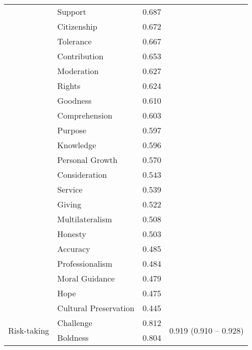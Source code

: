 \begin{longtable}{llcc}
                                  & Support                 & 0.687 & \\
                                  & Citizenship             & 0.672 & \\
                                  & Tolerance               & 0.667 & \\
                                  & Contribution            & 0.653 & \\
                                  & Moderation              & 0.627 & \\
                                  & Rights                  & 0.624 & \\
                                  & Goodness                & 0.610 & \\
                                  & Comprehension           & 0.603 & \\
                                  & Purpose                 & 0.597 & \\
                                  & Knowledge               & 0.596 & \\
                                  & Personal Growth         & 0.570 & \\
                                  & Consideration           & 0.543 & \\
                                  & Service                 & 0.539 & \\
                                  & Giving                  & 0.522 & \\
                                  & Multilateralism         & 0.508 & \\
                                  & Honesty                 & 0.503 & \\
                                  & Accuracy                & 0.485 & \\
                                  & Professionalism         & 0.484 & \\
                                  & Moral Guidance          & 0.479 & \\
                                  & Hope                    & 0.475 & \\
                                  & Cultural Preservation   & 0.445 & \\
        \midrule
        \multirow{24}{*}{Risk-taking} 
                                  & Challenge      & 0.812 & \multirow{24}{*}{0.919 (0.910 -- 0.928)} \\
                                  & Boldness       & 0.804 & \\

\end{longtable}
